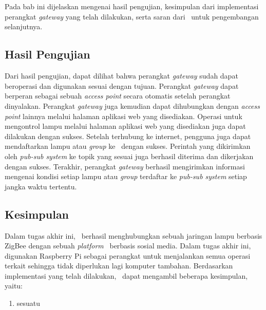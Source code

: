 \chapter{\babEnam}
Pada bab ini dijelaskan mengenai hasil pengujian, kesimpulan dari implementasi perangkat \textit{gateway} yang telah dilakukan, serta saran dari \saya~untuk pengembangan selanjutnya.

\section{Hasil Pengujian}
Dari hasil pengujian, dapat dilihat bahwa perangkat \textit{gateway} sudah dapat beroperasi dan digunakan sesuai dengan tujuan. Perangkat \textit{gateway} dapat berperan sebagai sebuah \textit{access point} secara otomatis setelah perangkat dinyalakan. Perangkat \textit{gateway} juga kemudian dapat dihubungkan dengan \textit{access point} lainnya melalui halaman aplikasi web yang disediakan. Operasi untuk mengontrol lampu melalui halaman aplikasi web yang disediakan juga dapat dilakukan dengan sukses. Setelah terhubung ke internet, pengguna juga dapat mendaftarkan lampu atau \textit{group} ke \plat~dengan sukses. Perintah yang dikirimkan oleh \textit{pub-sub system} ke topik yang sesuai juga berhasil diterima dan dikerjakan dengan sukses. Terakhir, perangkat \textit{gateway} berhasil mengirimkan informasi mengenai kondisi setiap lampu atau \textit{group} terdaftar ke \textit{pub-sub system} setiap jangka waktu tertentu.

\section{Kesimpulan}
Dalam tugas akhir ini, \saya~berhasil menghubungkan sebuah jaringan lampu berbasis ZigBee dengan sebuah \textit{platform} \iot~berbasis sosial media. Dalam tugas akhir ini, digunakan Raspberry Pi sebagai perangkat untuk menjalankan semua operasi terkait sehingga tidak diperlukan lagi komputer tambahan. Berdasarkan implementasi yang telah dilakukan, \saya~dapat mengambil beberapa kesimpulan, yaitu:
\begin{enumerate}
	\item sesuatu
\end{enumerate}